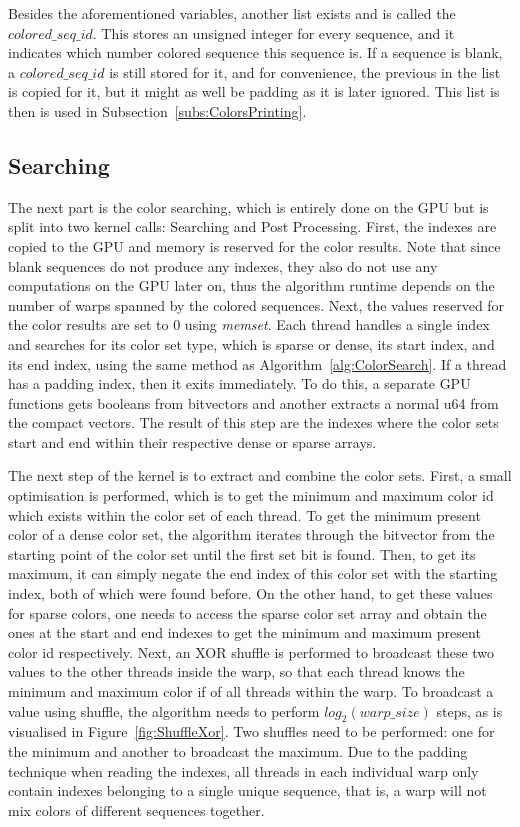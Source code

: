 Besides the aforementioned variables, another list exists and is called the $\mathit{colored\_seq\_id}$.
This stores an unsigned integer for every sequence, and it indicates which number colored sequence this sequence is.
If a sequence is blank, a $\mathit{colored\_seq\_id}$ is still stored for it, and for convenience, the previous in the list is copied for it, but it might as well be padding as it is later ignored.
This list is then is used in Subsection~\ref{subs:ColorsPrinting}.

\subsection{Searching}\label{subs:ColorSearch}

The next part is the color searching, which is entirely done on the GPU but is split into two kernel calls: Searching and Post Processing.
First, the indexes are copied to the GPU and memory is reserved for the color results.
Note that since blank sequences do not produce any indexes, they also do not use any computations on the GPU later on, thus the algorithm runtime depends on the number of warps spanned by the colored sequences.
Next, the values reserved for the color results are set to 0 using \textit{memset}.
Each thread handles a single index and searches for its color set type, which is sparse or dense, its start index, and its end index, using the same method as Algorithm~\ref{alg:ColorSearch}.
If a thread has a padding index, then it exits immediately.
To do this, a separate GPU functions gets booleans from bitvectors and another extracts a normal u64 from the compact vectors.
The result of this step are the indexes where the color sets start and end within their respective dense or sparse arrays.

The next step of the kernel is to extract and combine the color sets.
First, a small optimisation is performed, which is to get the minimum and maximum color id which exists within the color set of each thread.
To get the minimum present color of a dense color set, the algorithm iterates through the bitvector from the starting point of the color set until the first set bit is found.
Then, to get its maximum, it can simply negate the end index of this color set with the starting index, both of which were found before.
On the other hand, to get these values for sparse colors, one needs to access the sparse color set array and obtain the ones at the start and end indexes to get the minimum and maximum present color id respectively.
Next, an XOR shuffle is performed to broadcast these two values to the other threads inside the warp, so that each thread knows the minimum and maximum color if of all threads within the warp.
To broadcast a value using shuffle, the algorithm needs to perform $log_2(warp\_size)$ steps, as is visualised in Figure~\ref{fig:ShuffleXor}.
Two shuffles need to be performed: one for the minimum and another to broadcast the maximum.
Due to the padding technique when reading the indexes, all threads in each individual warp only contain indexes belonging to a single unique sequence, that is, a warp will not mix colors of different sequences together.

